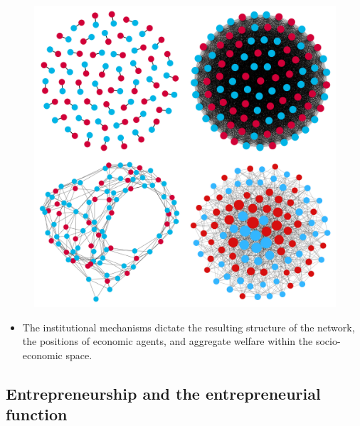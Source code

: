 \documentclass[10pt]{beamer}
\begin{document}
\begin{frame}
\begin{figure}[h]
\centering
\includegraphics[scale=0.075]{../Images/allSimulations.png}
\end{figure}
\begin{itemize}
\item The institutional mechanisms dictate the resulting structure of the network, the positions of economic agents, and aggregate welfare within the socio-economic space.
\end{itemize}
\end{frame}

\subsection{Entrepreneurship and the entrepreneurial function}
\end{document}
